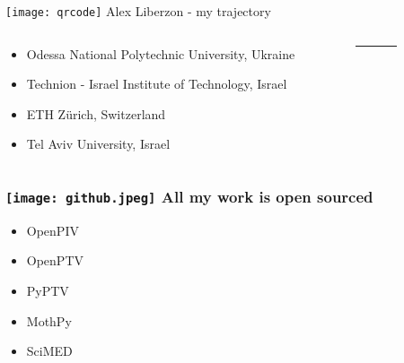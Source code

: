 

% 

%

\begin{frame}[label=intro-1]{\texttt{[image: qrcode]} Alex Liberzon - my trajectory }

\begin{columns}
\begin{column}{.78\textwidth}
\begin{card}
\begin{itemize}
\item Odessa National Polytechnic University, Ukraine
\item Technion - Israel Institute of Technology, Israel
\item ETH Z\"{u}rich, Switzerland
\item Tel Aviv University, Israel
\end{itemize}
\end{card}
\end{column}

    \begin{column}{.02\textwidth}
        \rule{.1mm}{0.7\textheight}
    \end{column}
    
\begin{column}{.2\textwidth}
\end{column}
\end{columns}
\end{frame}
%
\begin{frame}[label=intro-2]
\frametitle{\texttt{[image: github.jpeg]} All my work is open sourced  }
\begin{multicols}{2}
\begin{card}
\begin{itemize}
\item OpenPIV
\item OpenPTV
\item PyPTV
\item MothPy
\item SciMED
\end{itemize}
\end{card}
\end{multicols}
\end{frame}

